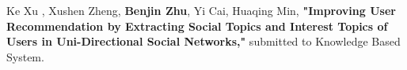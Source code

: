 \documentclass[letterpaper]{deedy-resume} %
\begin{document}
\begin{minipage}[t]{0.69\textwidth}


\begin{tightitemize}
\item Ke Xu , Xushen Zheng, \textbf{Benjin Zhu}, Yi Cai, Huaqing Min, \textbf{"Improving User Recommendation by Extracting Social Topics and Interest Topics of Users in Uni-Directional Social Networks,"} submitted to Knowledge Based System.




\end{tightitemize}

\sectionspace %




\end{minipage} %
\end{document}
